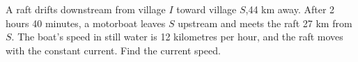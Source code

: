 A raft drifts downstream from village $I$ toward village $S$,44 km away. After 2 hours 40 minutes, a motorboat leaves $S$ upstream and meets the raft 27 km from $S$. The boat's speed in still water is 12 kilometres per hour, and the raft moves with the constant current. Find the current speed.
